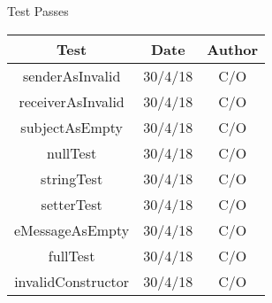 \documentclass{article}
\begin{document}
\begin{center}
    \vspace{100mm}
    \huge Test Passes \\
    \vspace{5mm}
    \small
    \begin{tabular}{|c|c|c|}
        \hline
        Test & Date & Author \\
        \hline
        senderAsInvalid & 30/4/18 & C/O \\
        \hline
        receiverAsInvalid & 30/4/18 & C/O \\
        \hline
        subjectAsEmpty & 30/4/18 & C/O \\
        \hline
        nullTest & 30/4/18 & C/O \\
        \hline
        stringTest & 30/4/18 & C/O \\
        \hline
        setterTest & 30/4/18 & C/O \\
        \hline
        eMessageAsEmpty & 30/4/18 & C/O \\
        \hline
        fullTest & 30/4/18 & C/O \\
        \hline
        invalidConstructor & 30/4/18 & C/O \\
        \hline
    \end{tabular}



    \end{center}
\end{document}
